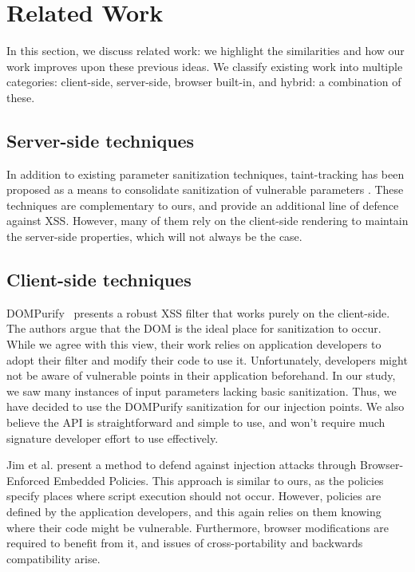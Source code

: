\section{Related Work}
In this section, we discuss related work: we highlight the similarities and how our work improves upon these previous ideas. We classify existing work into multiple categories: client-side, server-side, browser built-in, and hybrid: a combination of these.

\subsection{Server-side techniques} In addition to existing parameter sanitization techniques, taint-tracking has been proposed as a means to consolidate sanitization of vulnerable parameters \cite{Xu:2006:TPE:1267336.1267345,DBLP:conf/sec/Nguyen-TuongGGSE05,Pietraszek:2005:DAI:2146257.2146267,Bisht:2008:XPD:1428322.1428325}. These techniques are complementary to ours, and provide an additional line of defence against \ac{XSS}. However, many of them rely on the client-side rendering to maintain the server-side properties, which will not always be the case.

\subsection{Client-side techniques} 

DOMPurify~\cite{10.1007/978-3-319-66399-9_7} presents a robust \ac{XSS} filter that works purely on the client-side. The authors argue that the DOM is the ideal place for sanitization to occur. While we agree with this view, their work relies on application developers to adopt their filter and modify their code to use it. Unfortunately, developers might not be aware of vulnerable points in their application beforehand. In our study, we saw many instances of input parameters lacking basic sanitization. Thus, we have decided to use the DOMPurify sanitization for our injection points. We also believe the API is straightforward and simple to use, and won't require much signature developer effort to use effectively.

Jim et al. \cite{Jim:2007:DSI:1242572.1242654} present a method to defend against injection attacks through Browser-Enforced Embedded Policies. This approach is similar to ours, as the policies specify places where script execution should not occur. However, policies are defined by the application developers, and this again relies on them knowing where their code might be vulnerable. Furthermore, browser modifications are required to benefit from it, and issues of cross-portability and backwards compatibility arise.

